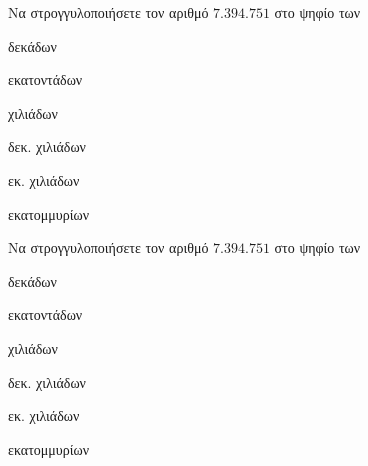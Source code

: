 Να στρογγυλοποιήσετε τον αριθμό $ 7.394.751 $ στο ψηφίο των
\begin{multicols}{2}
\begin{rlist}
\item δεκάδων
\item εκατοντάδων
\item χιλιάδων
\item δεκ. χιλιάδων
\item εκ. χιλιάδων
\item εκατομμυρίων
\end{rlist}
\end{multicols}
Να στρογγυλοποιήσετε τον αριθμό $ 7.394.751 $ στο ψηφίο των
\begin{multicols}{2}
\begin{rlist}
\item δεκάδων
\item εκατοντάδων
\item χιλιάδων
\item δεκ. χιλιάδων
\item εκ. χιλιάδων
\item εκατομμυρίων
\end{rlist}
\end{multicols}

